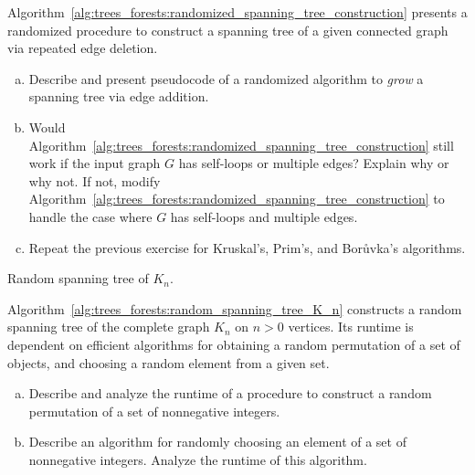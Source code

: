 \begin{problem}
\item Algorithm~\ref{alg:trees_forests:randomized_spanning_tree_construction}
  presents a randomized procedure to construct a
  spanning tree of a
  given connected graph via repeated edge deletion.
  \begin{enumerate}[(a)]
  \item Describe and present pseudocode of a
    randomized algorithm to \emph{grow} a
    spanning tree via edge addition.

  \item Would
    Algorithm~\ref{alg:trees_forests:randomized_spanning_tree_construction}
    still work if the input graph $G$ has self-loops or multiple
    edges? Explain why or why not. If not, modify
    Algorithm~\ref{alg:trees_forests:randomized_spanning_tree_construction}
    to handle the case where $G$ has self-loops and multiple edges.

  \item Repeat the previous exercise for
    Kruskal's,
    Prim's, and
    Bor\r{u}vka's algorithms.
  \end{enumerate}

\begin{algorithm}[!htbp]

\caption{Random spanning tree of $K_n$.}
\label{alg:trees_forests:random_spanning_tree_K_n}
\end{algorithm}

\item Algorithm~\ref{alg:trees_forests:random_spanning_tree_K_n}
  constructs a random spanning tree of the complete graph $K_n$ on
  $n > 0$ vertices. Its runtime is dependent on efficient algorithms
  for obtaining a random permutation of a set of objects, and choosing
  a random element from a given set.
  \begin{enumerate}[(a)]
  \item Describe and analyze the runtime of a procedure to construct a
    random permutation of a set of
    nonnegative integers.

  \item Describe an algorithm for randomly choosing an element of a
    set of nonnegative integers. Analyze the runtime of this
    algorithm.


\end{enumerate}
\end{problem}
